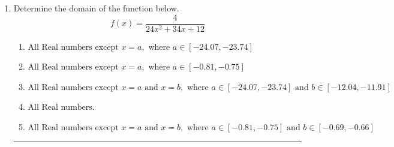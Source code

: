 \documentclass[14pt]{extbook}
\newcommand{\litem}[1]{\item#1\hspace*{-1cm}\rule{\textwidth}{0.4pt}}
\begin{document}
\begin{enumerate}
{\begin{enumerate}[label=\Alph*.]
\end{enumerate} }
\litem{
Determine the domain of the function below.\[ f(x) = \frac{4}{24x^{2} +34 x + 12} \]\begin{enumerate}[label=\Alph*.]
\item \( \text{All Real numbers except } x = a, \text{ where } a \in [-24.07, -23.74] \)
\item \( \text{All Real numbers except } x = a, \text{ where } a \in [-0.81, -0.75] \)
\item \( \text{All Real numbers except } x = a \text{ and } x = b, \text{ where } a \in [-24.07, -23.74] \text{ and } b \in [-12.04, -11.91] \)
\item \( \text{All Real numbers.} \)
\item \( \text{All Real numbers except } x = a \text{ and } x = b, \text{ where } a \in [-0.81, -0.75] \text{ and } b \in [-0.69, -0.66] \)


\end{enumerate}}
\end{enumerate}
\end{document}
